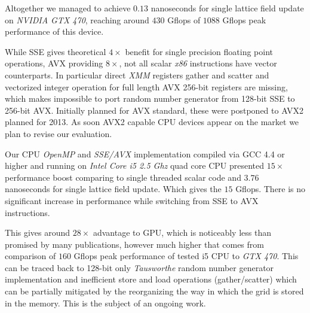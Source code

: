 \documentclass[11pt,a4paper]{article}
\begin{document}
Altogether we managed to achieve $0.13$ nanoseconds for single lattice
field update on \emph{NVIDIA GTX 470}, reaching around $430$ Gflops of
$1088$ Gflops peak performance of this device. 


While SSE gives theoretical $4\times$ benefit for single precision
floating point operations, AVX providing $8\times$, not all scalar
\emph{x86} instructions have vector counterparts.  In particular
direct \emph{XMM} registers gather and scatter and vectorized integer
operation for full length AVX 256-bit registers are missing, which makes
impossible to port random number generator from 128-bit SSE to 256-bit
AVX. Initially planned for AVX standard, these were postponed to AVX2
planned for 2013. As soon AVX2 capable CPU devices appear on the market
we plan to revise our evaluation.


Our CPU \emph{OpenMP} and \emph{SSE/AVX} implementation compiled via
GCC 4.4 or higher and running on \emph{Intel Core i5 2.5 Ghz} quad
core CPU presented $15\times$ performance boost comparing to single
threaded scalar code and $3.76$ nanoseconds for single lattice field
update.  Which gives the $15$ Gflops. There is no significant increase
in performance while switching from SSE to AVX instructions.

\newpage

This gives around $28\times$ advantage to GPU, which is noticeably
less than promised by many publications, however much higher that
comes from comparison of $160$ Gflops peak performance of tested i5
CPU to \emph{GTX 470}\cite{Lee:2010:DGV:1816038.1816021}. This can be
traced back to 128-bit only \emph{Tausworthe} random number generator
implementation and inefficient store and load operations
(gather/scatter) which can be partially mitigated by the reorganizing
the way in which the grid is stored in the memory. This is the subject
of an ongoing work.

{}

\end{document}
